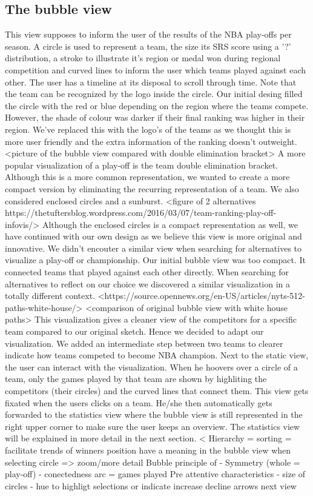 \documentclass{sigchi}
\begin{document}
\subsection{The bubble view}
This view supposes to inform the user of the results of the NBA play-offs per 
season. A circle is used to represent a team, the size its SRS score using a '?'
distribution, a stroke to illustrate it's region or medal won during regional 
competition and curved lines to inform the user which teams played against each 
other. The user has a timeline at its disposal to scroll through time. Note that
the team can be recognized by the logo inside the circle. Our initial desing filled
the circle with the red or blue depending on the region where the teams compete. 
However, the shade of colour was darker if their final ranking was higher in their
region. We've replaced this with the logo's of the teams as we thought this is more
user friendly and the extra information of the ranking doesn't outweight.
<picture of the bubble view compared with double elimination bracket>
A more popular visualization of a play-off is the team double elimination bracket.
Although this is a more common representation, we wanted to create a more compact
version by eliminating the recurring representation of a team. We also considered 
enclosed circles and a sunburst.
<figure of 2 alternatives https://thetuftersblog.wordpress.com/2016/03/07/team-ranking-play-off-infovis/>
Although the enclosed circles is a compact representation as well, we have continued 
with our own design as we believe this view is more original and innovative. We 
didn't encouter a similar view when searching for alternatives to visualize a 
play-off or championship. 
Our initial bubble view was too compact. It connected teams that played against
each other directly. When searching for alternatives to reflect on our choice we
discovered a similar visualization in a totally different context. 
<https://source.opennews.org/en-US/articles/nyts-512-paths-white-house/>
<comparison of original bubble view with white house paths>
This visualization gives a cleaner view of the competitors for a specific team
compared to our original sketch. Hence we decided to adapt our visualization. We
added an intermediate step between two teams to clearer indicate how teams competed
to become NBA champion.
Next to the static view, the user can interact with the visualization. When he 
hoovers over a circle of a team, only the games played by that team are shown by highliting the 
competitors (their circles) and the curved lines that connect them. This view gets 
fixated when the users clicks on a team.
He/she then automatically gets forwarded to the statistics view where the bubble 
view is still represented in the right upper corner to make sure the user keeps
an overview. The statistics view will be explained in more detail in the next section.
< Hierarchy = sorting = facilitate trends of winners
position have a meaning in the bubble view
when selecting circle => zoom/more detail
Bubble principle of 
- Symmetry (whole = play-off)
- conectedness arc = games played
Pre attentive characteristics
- size of circles
- hue to highligt selections or indicate increase decline arrows next view
\end{document}
